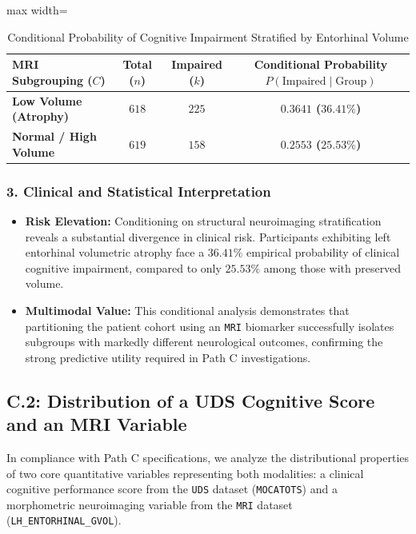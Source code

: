 \documentclass[11pt, a4paper]{article}
\begin{document}
\begin{table}[H]
\centering
\caption{Conditional Probability of Cognitive Impairment Stratified by Entorhinal Volume}
\label{tab:pathc_c1}
\begin{adjustbox}{max width=\textwidth}
\small
\begin{tabular}{lccc}
\toprule
\textbf{MRI Subgrouping ($C$)} & \textbf{Total ($n$)} & \textbf{Impaired ($k$)} & \textbf{Conditional Probability $P(\text{Impaired} \mid \text{Group})$} \\
\midrule
\textbf{Low Volume (Atrophy)} & $618$ & $225$ & \textbf{$0.3641$ ($36.41\%$)} \\
\textbf{Normal / High Volume} & $619$ & $158$ & \textbf{$0.2553$ ($25.53\%$)} \\
\bottomrule
\end{tabular}
\end{adjustbox}
\end{table}

\subsubsection*{3. Clinical and Statistical Interpretation}
\begin{itemize}
    \item \textbf{Risk Elevation:} Conditioning on structural neuroimaging stratification reveals a substantial divergence in clinical risk. Participants exhibiting left entorhinal volumetric atrophy face a $36.41\%$ empirical probability of clinical cognitive impairment, compared to only $25.53\%$ among those with preserved volume.
    \item \textbf{Multimodal Value:} This conditional analysis demonstrates that partitioning the patient cohort using an \texttt{MRI} biomarker successfully isolates subgroups with markedly different neurological outcomes, confirming the strong predictive utility required in Path C investigations.
\end{itemize}

\subsection{C.2: Distribution of a UDS Cognitive Score and an MRI Variable}
In compliance with Path C specifications, we analyze the distributional properties of two core quantitative variables representing both modalities: a clinical cognitive performance score from the \texttt{UDS} dataset (\texttt{MOCATOTS}) and a morphometric neuroimaging variable from the \texttt{MRI} dataset (\texttt{LH\_ENTORHINAL\_GVOL}).
\end{document}
